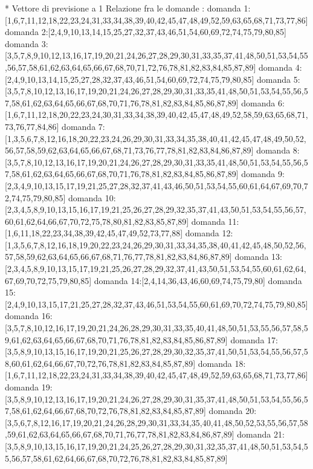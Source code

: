 * Vettore di previsione a 1
Relazione fra le domande :
domanda 1:[1,6,7,11,12,18,22,23,24,31,33,34,38,39,40,42,45,47,48,49,52,59,63,65,68,71,73,77,86]
domanda 2:[2,4,9,10,13,14,15,25,27,32,37,43,46,51,54,60,69,72,74,75,79,80,85]
domanda 3:[3,5,7,8,9,10,12,13,16,17,19,20,21,24,26,27,28,29,30,31,33,35,37,41,48,50,51,53,54,55,56,57,58,61,62,63,64,65,66,67,68,70,71,72,76,78,81,82,83,84,85,87,89]
domanda 4:[2,4,9,10,13,14,15,25,27,28,32,37,43,46,51,54,60,69,72,74,75,79,80,85]
domanda 5:[3,5,7,8,10,12,13,16,17,19,20,21,24,26,27,28,29,30,31,33,35,41,48,50,51,53,54,55,56,57,58,61,62,63,64,65,66,67,68,70,71,76,78,81,82,83,84,85,86,87,89]
domanda 6:[1,6,7,11,12,18,20,22,23,24,30,31,33,34,38,39,40,42,45,47,48,49,52,58,59,63,65,68,71,73,76,77,84,86]
domanda 7:[1,3,5,6,7,8,12,16,18,20,22,23,24,26,29,30,31,33,34,35,38,40,41,42,45,47,48,49,50,52,56,57,58,59,62,63,64,65,66,67,68,71,73,76,77,78,81,82,83,84,86,87,89]
domanda 8:[3,5,7,8,10,12,13,16,17,19,20,21,24,26,27,28,29,30,31,33,35,41,48,50,51,53,54,55,56,57,58,61,62,63,64,65,66,67,68,70,71,76,78,81,82,83,84,85,86,87,89]
domanda 9:[2,3,4,9,10,13,15,17,19,21,25,27,28,32,37,41,43,46,50,51,53,54,55,60,61,64,67,69,70,72,74,75,79,80,85]
domanda 10:[2,3,4,5,8,9,10,13,15,16,17,19,21,25,26,27,28,29,32,35,37,41,43,50,51,53,54,55,56,57,60,61,62,64,66,67,70,72,75,78,80,81,82,83,85,87,89]
domanda 11:[1,6,11,18,22,23,34,38,39,42,45,47,49,52,73,77,88]
domanda 12:[1,3,5,6,7,8,12,16,18,19,20,22,23,24,26,29,30,31,33,34,35,38,40,41,42,45,48,50,52,56,57,58,59,62,63,64,65,66,67,68,71,76,77,78,81,82,83,84,86,87,89]
domanda 13:[2,3,4,5,8,9,10,13,15,17,19,21,25,26,27,28,29,32,37,41,43,50,51,53,54,55,60,61,62,64,67,69,70,72,75,79,80,85]
domanda 14:[2,4,14,36,43,46,60,69,74,75,79,80]
domanda 15:[2,4,9,10,13,15,17,21,25,27,28,32,37,43,46,51,53,54,55,60,61,69,70,72,74,75,79,80,85]
domanda 16:[3,5,7,8,10,12,16,17,19,20,21,24,26,28,29,30,31,33,35,40,41,48,50,51,53,55,56,57,58,59,61,62,63,64,65,66,67,68,70,71,76,78,81,82,83,84,85,86,87,89]
domanda 17:[3,5,8,9,10,13,15,16,17,19,20,21,25,26,27,28,29,30,32,35,37,41,50,51,53,54,55,56,57,58,60,61,62,64,66,67,70,72,76,78,81,82,83,84,85,87,89]
domanda 18:[1,6,7,11,12,18,22,23,24,31,33,34,38,39,40,42,45,47,48,49,52,59,63,65,68,71,73,77,86]
domanda 19:[3,5,8,9,10,12,13,16,17,19,20,21,24,26,27,28,29,30,31,35,37,41,48,50,51,53,54,55,56,57,58,61,62,64,66,67,68,70,72,76,78,81,82,83,84,85,87,89]
domanda 20:[3,5,6,7,8,12,16,17,19,20,21,24,26,28,29,30,31,33,34,35,40,41,48,50,52,53,55,56,57,58,59,61,62,63,64,65,66,67,68,70,71,76,77,78,81,82,83,84,86,87,89]
domanda 21:[3,5,8,9,10,13,15,16,17,19,20,21,24,25,26,27,28,29,30,31,32,35,37,41,48,50,51,53,54,55,56,57,58,61,62,64,66,67,68,70,72,76,78,81,82,83,84,85,87,89]
